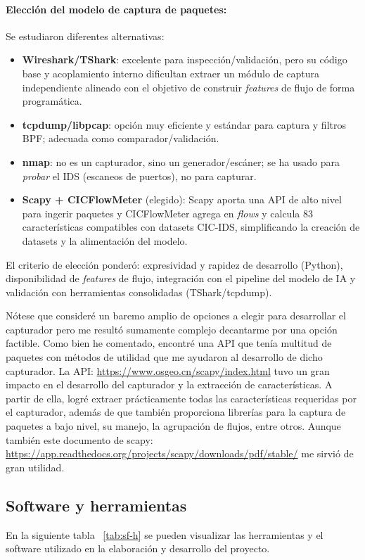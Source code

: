 \paragraph{Elección del modelo de captura de paquetes:}
Se estudiaron diferentes alternativas:
\begin{itemize}
  \item \textbf{Wireshark/TShark}: excelente para inspección/validación, pero su código base y acoplamiento interno dificultan extraer un módulo de captura independiente alineado con el objetivo de construir \textit{features} de flujo de forma programática.
  \item \textbf{tcpdump/libpcap}: opción muy eficiente y estándar para captura y filtros BPF; adecuada como comparador/validación.
  \item \textbf{nmap}: no es un capturador, sino un generador/escáner; se ha usado para \emph{probar} el IDS (escaneos de puertos), no para capturar.
  \item \textbf{Scapy + CICFlowMeter} (elegido): Scapy aporta una API de alto nivel para ingerir paquetes y CICFlowMeter agrega en \textit{flows} y calcula 83 características compatibles con datasets CIC‑IDS, simplificando la creación de datasets y la alimentación del modelo.
\end{itemize}
El criterio de elección ponderó: expresividad y rapidez de desarrollo (Python), disponibilidad de \textit{features} de flujo, integración con el pipeline del modelo de IA y validación con herramientas consolidadas (TShark/tcpdump).

Nótese que consideré un baremo amplio de opciones a elegir para desarrollar el capturador pero me resultó sumamente complejo decantarme por una opción factible. Como bien he comentado, encontré una API que tenía multitud de paquetes con métodos de utilidad que me ayudaron al desarrollo de dicho capturador. La API: \url{https://www.osgeo.cn/scapy/index.html} tuvo un gran impacto en el desarrollo del capturador y la extracción de características. A partir de ella, logré extraer prácticamente todas las características requeridas por el capturador, además de que también proporciona librerías para la captura de paquetes a bajo nivel, su manejo, la agrupación de flujos, entre otros. Aunque también este documento de scapy: \url{https://app.readthedocs.org/projects/scapy/downloads/pdf/stable/} me sirvió de gran utilidad.

\subsection{Software y herramientas}
En la siguiente tabla ~\ref{tab:sf-h} se pueden visualizar las herramientas y el software utilizado en la elaboración y desarrollo del proyecto.


